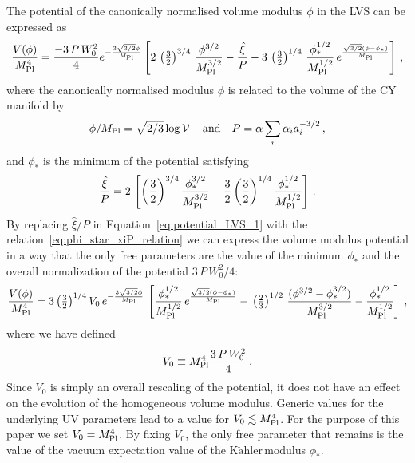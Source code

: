 \documentclass[12pt]{article}
\newcommand{\be}{\begin{equation}}
\newcommand{\ee}{\end{equation}}
\newcommand{\Kahler}{\ensuremath{\text{K}\ddot{\text{a}}\text{hler}\,}}
\begin{document}
The potential of the canonically normalised volume modulus $\phi$ in the LVS can be expressed as~\cite{Cicoli:2016olq}
\be
\frac{V(\phi)}{M^4_{\rm Pl}}=\frac{-3\,P\,W_0^2}{4}e^{-\frac{3\sqrt{3/2}\phi}{M_{\rm Pl}}}\left[2\,\left(\tfrac{3}{2}\right)^{3/4}\,\frac{\phi^{3/2}}{M^{3/2}_{\rm Pl}} -\frac{\hat{\xi}}{P} - 3\,\left(\tfrac{3}{2}\right)^{1/4}\,\frac{\phi_*^{1/2}}{M^{1/2}_{\rm Pl}}\,e^{\frac{\sqrt{3/2}(\phi -\phi_*)}{M_{\rm Pl}}}  \right]\,,
\label{eq:potential_LVS_1}
\ee
where the canonically normalised modulus $\phi$ is related to the volume of the CY manifold by
\be
\phi/M_{\rm Pl} = \sqrt{2/3}\log{\mathcal{V}}\,\quad\textrm{and}\quad P=\alpha\sum_{i}\alpha_i a_i^{-3/2}\,,
\ee
and $\phi_*$ is the minimum of the potential satisfying 
\be
\frac{\hat{\xi}}{P} = 2\,\left[\left(\frac{3}{2}\right)^{3/4}\frac{\phi_*^{3/2}}{M^{3/2}_{\rm Pl}} - \frac{3}{2}\left(\frac{3}{2}\right)^{1/4}\frac{\phi_*^{1/2}}{M^{1/2}_{\rm Pl}} \right]\,.
\label{eq:phi_star_xiP_relation}
\ee
By replacing $\hat{\xi}/P$ in Equation~\eqref{eq:potential_LVS_1} with the relation~\eqref{eq:phi_star_xiP_relation} we can express the volume modulus potential in a way that the only free parameters are the value of the minimum $\phi_*$ and the overall normalization of the potential $3\,P\,W_0^2/4$: 
\begin{equation}
\frac{V(\phi)}{M^4_{\rm Pl}}=3\left(\tfrac{3}{2}\right)^{1/4}V_0\,e^{-\frac{3\sqrt{3/2}\phi}{M_{\rm Pl}}}\,\left[\frac{\phi_*^{1/2}}{M^{1/2}_{\rm Pl}}\,e^{\frac{\sqrt{3/2}(\phi -\phi_*)}{M_{\rm Pl}}} - \,\left(\tfrac{2}{3}\right)^{1/2}\,\frac{(\phi^{3/2}-\phi_*^{3/2} )}{M^{3/2}_{\rm Pl}}- \frac{\phi_*^{1/2}}{M^{1/2}_{\rm Pl}}\right]\,,
\label{eq:potential_LVS_2}
\end{equation}
where we have defined
\be
V_0 \equiv M^4_{\rm Pl}\frac{3\,P\,W_0^2}{4}\,.
\ee
Since $V_0$ is simply an overall rescaling of the potential, it does not have an effect on the evolution of the homogeneous volume modulus. Generic values for the underlying UV parameters lead to a value for $V_0\lesssim  M^4_{\rm Pl}$. For the purpose of this paper we set $V_0=M^4_{\rm Pl}$. By fixing $V_0$, the only free parameter that remains is the value of the vacuum expectation value of the \Kahler modulus $\phi_*$.
\end{document}
